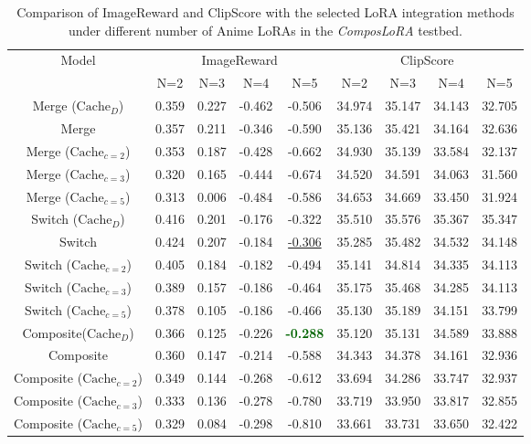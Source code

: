 \begin{table}[H]
\caption{Comparison of ImageReward and ClipScore with the selected LoRA integration methods under different number of Anime LoRAs in the \textit{ComposLoRA} testbed.}
\label{animeirclipfull}
\begin{center}
\begin{tabular}{c|cccc|cccc}
\toprule
\multirow{2}{*}{Model} & \multicolumn{4}{c|}{ImageReward} & \multicolumn{4}{c}{ClipScore} \\
\cmidrule(lr){2-5} \cmidrule(lr){6-9}
& N=2 & N=3 & N=4 & N=5 & N=2 & N=3 & N=4 & N=5 \\
\midrule
Merge ($\text{Cache}_{D}$) & 0.359  & 0.227   & -0.462  & -0.506 & 34.974   & 35.147  & 34.143  & 32.705 \\
Merge  & 0.357  & 0.211  & -0.346 & -0.590 & 35.136 & 35.421  & 34.164  & 32.636  \\
Merge ($\text{Cache}_{c=2}$) & 0.353  & 0.187   & -0.428   & -0.662  & 34.930   & 35.139  & 33.584   & 32.137  \\
Merge ($\text{Cache}_{c=3}$) & 0.320  & 0.165  & -0.444  & -0.674  & 34.520   & 34.591  & 34.063  & 31.560 \\
Merge ($\text{Cache}_{c=5}$) & 0.313   & 0.006   & -0.484  & -0.586  & 34.653   & 34.669  & 33.450  & 31.924  \\

Switch ($\text{Cache}_{D}$) & 0.416  & 0.201  & -0.176  & -0.322  & 35.510  & 35.576 & 35.367  & 35.347  \\
Switch & 0.424   & 0.207  &  -0.184 & \underline{-0.306}  & 35.285  & 35.482  & 34.532  & 34.148 \\
Switch ($\text{Cache}_{c=2}$)& 0.405   & 0.184  & -0.182  & -0.494  & 35.141  & 34.814  & 34.335   & 34.113  \\
Switch ($\text{Cache}_{c=3}$)& 0.389  & 0.157  & -0.186  & -0.464  & 35.175  & 35.468  & 34.285  & 34.113  \\
Switch ($\text{Cache}_{c=5}$)& 0.378  & 0.105  & -0.186  & -0.466  & 35.130  & 35.189  & 34.151  & 33.799  \\
Composite($\text{Cache}_{D}$) & 0.366  & 0.125  & -0.226 & \textcolor{darkgreen}{\textbf{-0.288}}  & 35.120  & 35.131  & 34.589   & 33.888  \\
Composite & 0.360  & 0.147  & -0.214  & -0.588  & 34.343  & 34.378  & 34.161  & 32.936  \\
Composite ($\text{Cache}_{c=2}$)& 0.349  & 0.144  & -0.268  & -0.612   & 33.694  & 34.286  & 33.747   & 32.937  \\
Composite ($\text{Cache}_{c=3}$)& 0.333  & 0.136  & -0.278  & -0.780  & 33.719  & 33.950  & 33.817  & 32.855  \\
Composite ($\text{Cache}_{c=5}$)& 0.329   & 0.084  & -0.298 & -0.810  & 33.661  & 33.731  & 33.650  & 32.422  \\


\end{tabular}
\end{center}
\end{table}
